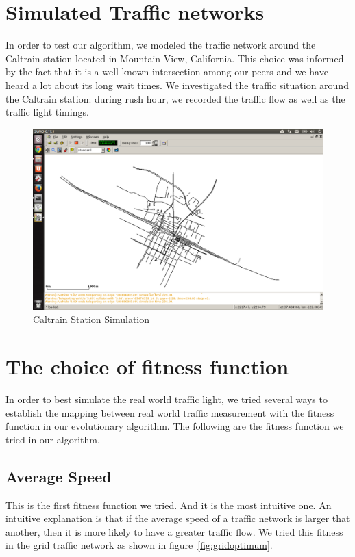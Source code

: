 \documentclass{article} %
\begin{document}
\section{Simulated Traffic networks}
In order to test our algorithm, we modeled the traffic network around the Caltrain station located in Mountain View, California. This choice was informed by the fact that it is a well-known intersection among our peers and we have heard a lot about its long wait times. We investigated the traffic situation around the Caltrain station: during rush hour, we recorded the traffic flow as well as the traffic light timings.
\begin{figure}
\caption{Caltrain Station Simulation}
\includegraphics[width=\textwidth]{images/caltrain.png}
\end{figure}


\section{The choice of fitness function}
In order to best simulate the real world traffic light, we tried several ways to establish the mapping between real world traffic measurement with the fitness function in our evolutionary algorithm. The following are the fitness function we tried in our algorithm.
\subsection{Average Speed}
This is the first fitness function we tried. And it is the most intuitive one. An intuitive explanation is that if the average speed of a traffic network is larger that another, then it is more likely to have a greater traffic flow. We tried this fitness in the grid traffic network as shown in figure~\ref{fig:gridoptimum}.
\end{document}
